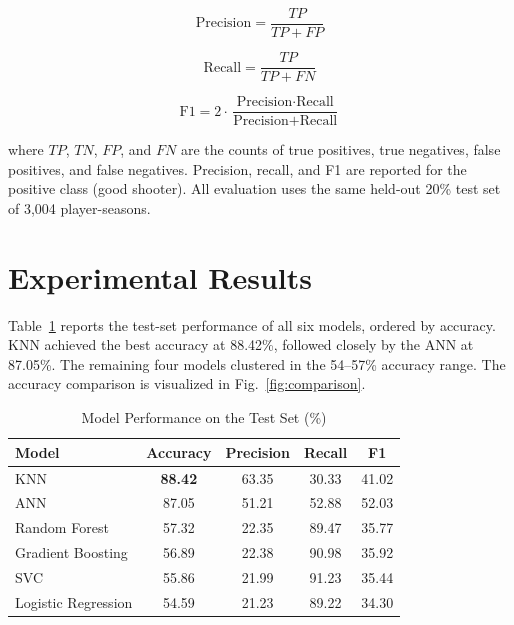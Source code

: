 \documentclass[conference]{IEEEtran}
\begin{document}
\begin{equation}
\text{Precision} = \frac{TP}{TP + FP}
\end{equation}

\begin{equation}
\text{Recall} = \frac{TP}{TP + FN}
\end{equation}

\begin{equation}
\text{F1} = 2 \cdot \frac{\text{Precision} \cdot \text{Recall}}{\text{Precision} + \text{Recall}}
\end{equation}

where $TP$, $TN$, $FP$, and $FN$ are the counts of true positives, true negatives, false positives, and false negatives. Precision, recall, and F1 are reported for the positive class (good shooter). All evaluation uses the same held-out 20\% test set of 3{,}004 player-seasons.


\section{Experimental Results}

Table~\ref{tab:results} reports the test-set performance of all six models, ordered by accuracy. KNN achieved the best accuracy at 88.42\%, followed closely by the ANN at 87.05\%. The remaining four models clustered in the 54--57\% accuracy range. The accuracy comparison is visualized in Fig.~\ref{fig:comparison}.

\begin{table}[H]
\centering
\caption{Model Performance on the Test Set (\%)}
\begin{tabular}{|l|c|c|c|c|}
\hline
\textbf{Model} & \textbf{Accuracy} & \textbf{Precision} & \textbf{Recall} & \textbf{F1} \\
\hline
KNN & \textbf{88.42} & 63.35 & 30.33 & 41.02 \\
\hline
ANN & 87.05 & 51.21 & 52.88 & 52.03 \\
\hline
Random Forest & 57.32 & 22.35 & 89.47 & 35.77 \\
\hline
Gradient Boosting & 56.89 & 22.38 & 90.98 & 35.92 \\
\hline
SVC & 55.86 & 21.99 & 91.23 & 35.44 \\
\hline
Logistic Regression & 54.59 & 21.23 & 89.22 & 34.30 \\
\hline
\end{tabular}
\label{tab:results}
\end{table}
\end{document}
